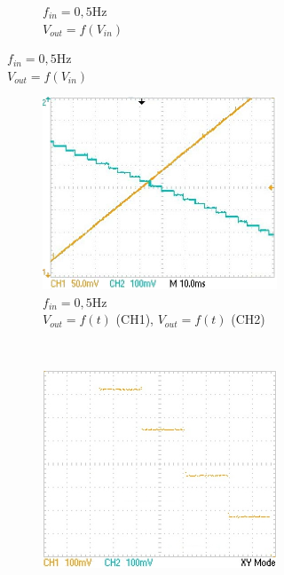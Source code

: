 \documentclass{article}
\begin{document}
\begin{figure}
\begin{subfigure}[b]{0.3\textwidth}
\begin{subfigure}[b]{\textwidth}
			\caption{\centering $f_{in}=\mathrm{0,5 Hz}$\\$V_{out}=f(V_{in})$}
			\label{fig:midXY}
		\end{subfigure}
	\end{subfigure}
	\hfill
	\begin{subfigure}[b]{0.3\textwidth}
		\begin{subfigure}[b]{\textwidth}
			\centering
			\includegraphics[width=\textwidth]{data/TEK0018_}
			\caption{\centering $f_{in}=\mathrm{0,5 Hz}$\\$V_{out}=f(t)$ (CH1), $V_{out}=f(t)$ (CH2)}
			\label{fig:fastT}
		\end{subfigure}
		\\
		\begin{subfigure}[b]{\textwidth}
			\centering
			\includegraphics[width=\textwidth]{data/TEK0020_}

\end{subfigure}
\end{subfigure}
\end{figure}
\end{document}
